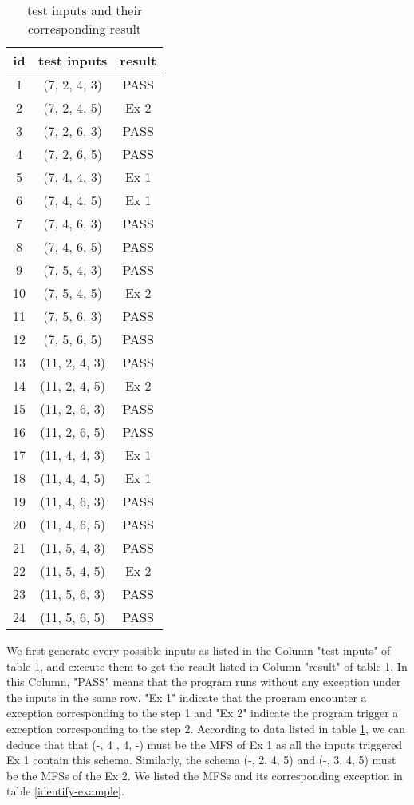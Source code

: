 \documentclass{sig-alternate}
\begin{document}
\begin{table}
\centering
\caption{test inputs and their corresponding result}
\label{test-example}
\begin{tabular}{|c|c|c|} \hline
id&test inputs & result\\\hline
1&(7, 2, 4, 3) &  PASS\\ \hline
2&(7, 2, 4, 5) &  Ex 2\\ \hline
3&(7, 2, 6, 3) &  PASS\\ \hline
4&(7, 2, 6, 5) &  PASS\\ \hline
5&(7, 4, 4, 3) &  Ex 1\\ \hline
6&(7, 4, 4, 5) &  Ex 1\\ \hline
7&(7, 4, 6, 3) &  PASS\\ \hline
8&(7, 4, 6, 5) &  PASS\\ \hline
9&(7, 5, 4, 3) &  PASS\\ \hline
10&(7, 5, 4, 5) &  Ex 2\\ \hline
11&(7, 5, 6, 3) &  PASS\\ \hline
12&(7, 5, 6, 5) &  PASS\\ \hline
13&(11, 2, 4, 3) &  PASS\\ \hline
14&(11, 2, 4, 5) &  Ex 2\\ \hline
15&(11, 2, 6, 3) &  PASS\\ \hline
16&(11, 2, 6, 5) &  PASS\\ \hline
17&(11, 4, 4, 3) &  Ex 1\\ \hline
18&(11, 4, 4, 5) &  Ex 1\\ \hline
19&(11, 4, 6, 3) &  PASS\\ \hline
20&(11, 4, 6, 5) &  PASS\\ \hline
21&(11, 5, 4, 3) &  PASS\\ \hline
22&(11, 5, 4, 5) &  Ex 2\\ \hline
23&(11, 5, 6, 3) &  PASS\\ \hline
24&(11, 5, 6, 5) &  PASS\\ \hline
\hline\end{tabular}
\end{table}

We first generate every possible inputs as listed in the Column "test inputs" of table \ref{test-example}, and execute them to get the result listed in Column "result" of table \ref{test-example}. In this Column, "PASS" means that the program runs without any exception under the inputs in the same row. "Ex 1" indicate that the program encounter a exception corresponding to the step 1 and "Ex 2" indicate the program trigger a exception corresponding to the step 2. According to data listed in table \ref{test-example}, we can deduce that that (-, 4 , 4, -) must be the MFS of Ex 1 as all the inputs triggered Ex 1 contain this schema. Similarly, the schema (-, 2, 4, 5) and  (-, 3, 4, 5) must be the MFSs of the Ex 2. We listed the MFSs and its corresponding exception in table \ref{identify-example}.
\end{document}
